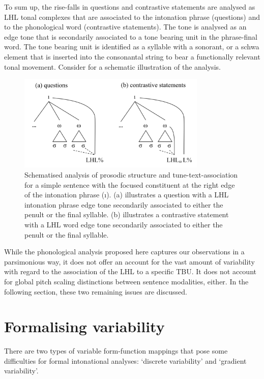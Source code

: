 To sum up, the rise-falls in questions and contrastive statements are analysed as LHL tonal complexes that are associated to the intonation phrase (questions) and to the phonological word (contrastive statements). The tone is analysed as an edge tone that is secondarily associated to a tone bearing unit in the phrase-final word. The tone bearing unit is identified as a syllable with a sonorant, or a schwa element that is inserted into the consonantal string to bear a functionally relevant tonal movement. Consider  for a schematic illustration of the analysis.

\begin{figure} 
  \centering 
   \includegraphics[width=0.8\textwidth]{figures/Figure_7_3.png}
  \caption{Schematised analysis of prosodic structure and tune-text-association for a simple sentence with the focused constituent at the right edge of the intonation phrase (ı). (a) illustrates a question with a LHL intonation phrase edge tone secondarily associated to either the penult or the final syllable. (b) illustrates a contrastive statement with a LHL word edge tone secondarily associated to either the penult or the final syllable.}
   \label{fig:7.3}
   \end{figure}
   
While the phonological analysis proposed here captures our observations in a parsimonious way, it does not offer an account for the vast amount of variability with regard to the association of the LHL to a specific TBU. It does not account for global pitch scaling distinctions between sentence modalities, either. In the following section, these two remaining issues are discussed.
  
\section{Formalising variability}  \label{sec:7.4}
There are two types of variable form-function mappings that pose some difficulties for formal intonational analyses: ‘discrete variability’ and ‘gradient variability’.


